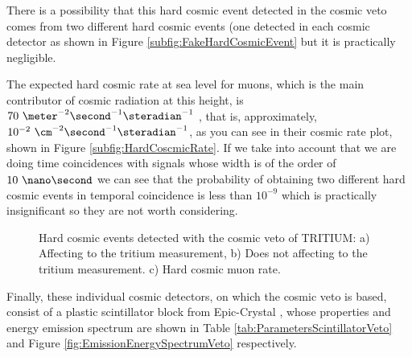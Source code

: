 There is a possibility that this hard cosmic event detected in the cosmic veto comes from two different hard cosmic events (one detected in each cosmic detector as shown in Figure \ref{subfig:FakeHardCosmicEvent} but it is practically negligible.

The expected hard cosmic rate at sea level for muons, which is the main contributor of cosmic radiation at this height, is $70~\meter^{-2}\second^{-1}\steradian^{-1}$ \cite{PDG}\cite{HardCosmicMuonRate}, that is, approximately, $10^{-2}~\cm^{-2}\second^{-1}\steradian^{-1}$, as you can see in their cosmic rate plot, shown in Figure \ref{subfig:HardCoscmicRate}. If we take into account that we are doing time coincidences with signals whose width is of the order of $10~\nano\second$ we can see that the probability of obtaining two different hard cosmic events in temporal coincidence is less than $10^{-9}$ which is practically insignificant so they are not worth considering.

\begin{figure}[h]
 \centering
 \caption{Hard cosmic events detected with the cosmic veto of TRITIUM: a) Affecting to the tritium measurement, b) Does not affecting to the tritium measurement. c) Hard cosmic muon rate. }
 \label{fig:HardCosmicEventsSimulation}
\end{figure}

Finally, these individual cosmic detectors, on which the cosmic veto is based, consist of a plastic scintillator block from Epic-Crystal \cite{ScintillatorVeto}, whose properties and energy emission spectrum are shown in Table \ref{tab:ParametersScintillatorVeto} and Figure \ref{fig:EmissionEnergySpectrumVeto} respectively.

